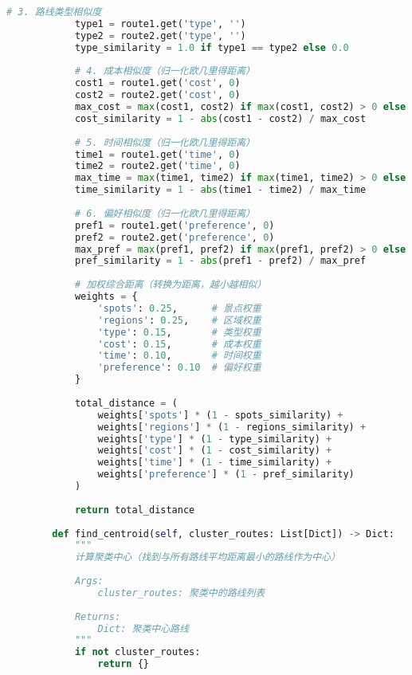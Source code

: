 \begin{lstlisting}[language=Python]
            # 3. 路线类型相似度
            type1 = route1.get('type', '')
            type2 = route2.get('type', '')
            type_similarity = 1.0 if type1 == type2 else 0.0
            
            # 4. 成本相似度（归一化欧几里得距离）
            cost1 = route1.get('cost', 0)
            cost2 = route2.get('cost', 0)
            max_cost = max(cost1, cost2) if max(cost1, cost2) > 0 else 1
            cost_similarity = 1 - abs(cost1 - cost2) / max_cost
            
            # 5. 时间相似度（归一化欧几里得距离）
            time1 = route1.get('time', 0)
            time2 = route2.get('time', 0)
            max_time = max(time1, time2) if max(time1, time2) > 0 else 1
            time_similarity = 1 - abs(time1 - time2) / max_time
            
            # 6. 偏好相似度（归一化欧几里得距离）
            pref1 = route1.get('preference', 0)
            pref2 = route2.get('preference', 0)
            max_pref = max(pref1, pref2) if max(pref1, pref2) > 0 else 1
            pref_similarity = 1 - abs(pref1 - pref2) / max_pref
            
            # 加权综合距离（转换为距离，越小越相似）
            weights = {
                'spots': 0.25,      # 景点权重
                'regions': 0.25,    # 区域权重
                'type': 0.15,       # 类型权重
                'cost': 0.15,       # 成本权重
                'time': 0.10,       # 时间权重
                'preference': 0.10  # 偏好权重
            }
            
            total_distance = (
                weights['spots'] * (1 - spots_similarity) +
                weights['regions'] * (1 - regions_similarity) +
                weights['type'] * (1 - type_similarity) +
                weights['cost'] * (1 - cost_similarity) +
                weights['time'] * (1 - time_similarity) +
                weights['preference'] * (1 - pref_similarity)
            )
            
            return total_distance
        
        def find_centroid(self, cluster_routes: List[Dict]) -> Dict:
            """
            计算聚类中心（找到与所有路线平均距离最小的路线作为中心）
            
            Args:
                cluster_routes: 聚类中的路线列表
                
            Returns:
                Dict: 聚类中心路线
            """
            if not cluster_routes:
                return {}
            

\end{lstlisting}
